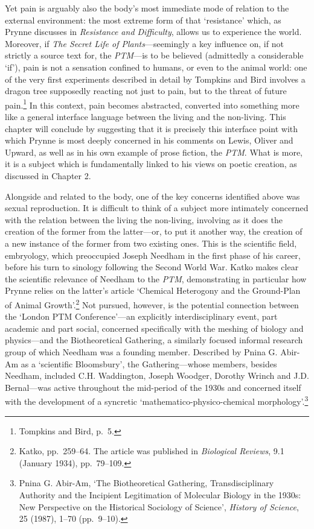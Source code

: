 \documentclass[]{article}
\begin{document}
\noindent Yet pain is arguably also the body’s most immediate mode of
relation to the external environment: the most extreme form of that
‘resistance’ which, as Prynne discusses in \emph{Resistance and
Difficulty}, allows us to experience the world. Moreover, if \emph{The
Secret Life of Plants}—seemingly a key influence on, if not strictly a
source text for, the \emph{PTM}—is to be believed (admittedly a
considerable ‘if’), pain is not a sensation confined to humans, or even
to the animal world: one of the very first experiments described in
detail by Tompkins and Bird involves a dragon tree supposedly reacting
not just to pain, but to the threat of future pain.\footnote{Tompkins
  and Bird, p.~5.} In this context, pain becomes abstracted, converted
into something more like a general interface language between the living
and the non-living. This chapter will conclude by suggesting that it is
precisely this interface point with which Prynne is most deeply
concerned in his comments on Lewis, Oliver and Upward, as well as in his
own example of prose fiction, the \emph{PTM}. What is more, it is a
subject which is fundamentally linked to his views on poetic creation,
as discussed in Chapter 2.

Alongside and related to the body, one of the key concerns identified
above was sexual reproduction. It is difficult to think of a subject
more intimately concerned with the relation between the living the
non-living, involving as it does the creation of the former from the
latter—or, to put it another way, the creation of a new instance of the
former from two existing ones. This is the scientific field, embryology,
which preoccupied Joseph Needham in the first phase of his career,
before his turn to sinology following the Second World War. Katko makes
clear the scientific relevance of Needham to the \emph{PTM},
demonstrating in particular how Prynne relies on the latter’s article
‘Chemical Heterogony and the Ground-Plan of Animal Growth’.\footnote{Katko,
  pp.~259–64. The article was published in \emph{Biological Reviews},
  9.1 (January 1934), pp.~79–109.} Not pursued, however, is the
potential connection between the ‘London PTM Conference’—an explicitly
interdisciplinary event, part academic and part social, concerned
specifically with the meshing of biology and physics—and the
Biotheoretical Gathering, a similarly focused informal research group of
which Needham was a founding member. Described by Pnina G. Abir-Am as a
‘scientific Bloomsbury’, the Gathering—whose members, besides Needham,
included C.H. Waddington, Joseph Woodger, Dorothy Wrinch and J.D.
Bernal—was active throughout the mid-period of the 1930s and concerned
itself with the development of a syncretic ‘mathematico-physico-chemical
morphology’.\footnote{Pnina G. Abir-Am, ‘The Biotheoretical Gathering,
  Transdisciplinary Authority and the Incipient Legitimation of
  Molecular Biology in the 1930s: New Perspective on the Historical
  Sociology of Science’, \emph{History of Science}, 25 (1987), 1–70
  (pp.~9–10).}
\end{document}
